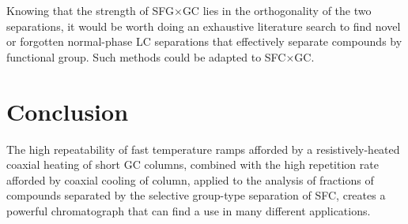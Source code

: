 Knowing that the strength of SFG×GC lies in the orthogonality of the two
separations, it would be worth doing an exhaustive literature search to find
novel or forgotten normal-phase LC separations that effectively separate
compounds by functional group. Such methods could be adapted to SFC×GC.

\section{Conclusion}

The high repeatability of fast temperature ramps afforded by a
resistively-heated coaxial heating of short GC columns, combined with the high
repetition rate afforded by coaxial cooling of column, applied to the analysis
of fractions of compounds separated by the selective group-type separation of
SFC, creates a powerful chromatograph that can find a use in many different
applications.

\todos
